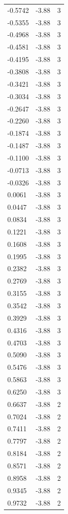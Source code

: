 \begin{longtable}{lrr}
  -0.5742 & -3.88 & 3 \\
  -0.5355 & -3.88 & 3 \\
  -0.4968 & -3.88 & 3 \\
  -0.4581 & -3.88 & 3 \\
  -0.4195 & -3.88 & 3 \\
  -0.3808 & -3.88 & 3 \\
  -0.3421 & -3.88 & 3 \\
  -0.3034 & -3.88 & 3 \\
  -0.2647 & -3.88 & 3 \\
  -0.2260 & -3.88 & 3 \\
  -0.1874 & -3.88 & 3 \\
  -0.1487 & -3.88 & 3 \\
  -0.1100 & -3.88 & 3 \\
  -0.0713 & -3.88 & 3 \\
  -0.0326 & -3.88 & 3 \\
  0.0061 & -3.88 & 3 \\
  0.0447 & -3.88 & 3 \\
  0.0834 & -3.88 & 3 \\
  0.1221 & -3.88 & 3 \\
  0.1608 & -3.88 & 3 \\
  0.1995 & -3.88 & 3 \\
  0.2382 & -3.88 & 3 \\
  0.2769 & -3.88 & 3 \\
  0.3155 & -3.88 & 3 \\
  0.3542 & -3.88 & 3 \\
  0.3929 & -3.88 & 3 \\
  0.4316 & -3.88 & 3 \\
  0.4703 & -3.88 & 3 \\
  0.5090 & -3.88 & 3 \\
  0.5476 & -3.88 & 3 \\
  0.5863 & -3.88 & 3 \\
  0.6250 & -3.88 & 3 \\
  0.6637 & -3.88 & 2 \\
  0.7024 & -3.88 & 2 \\
  0.7411 & -3.88 & 2 \\
  0.7797 & -3.88 & 2 \\
  0.8184 & -3.88 & 2 \\
  0.8571 & -3.88 & 2 \\
  0.8958 & -3.88 & 2 \\
  0.9345 & -3.88 & 2 \\
  0.9732 & -3.88 & 2 \\

\end{longtable}

